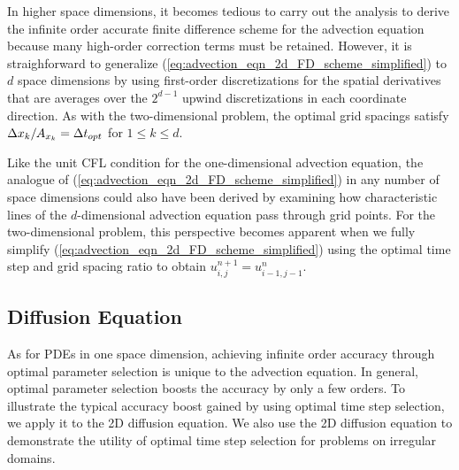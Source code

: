 \documentclass[oneeqnum,onefignum,onetabnum,onethmnum]{siamltex}
\begin{document}
In higher space dimensions, it becomes tedious to carry out the analysis 
to derive the infinite order accurate finite difference scheme for the 
advection equation because many high-order correction terms must be retained.  
However, it is straighforward to generalize 
(\ref{eq:advection_eqn_2d_FD_scheme_simplified}) to $d$ space dimensions by 
using first-order discretizations for the spatial derivatives that are 
averages over the $2^{d-1}$ upwind discretizations in each coordinate 
direction.   As with the two-dimensional problem, the optimal grid spacings 
satisfy $\Delta x_k/A_{x_k} = \Delta t_{opt}$ for $1 \le k \le d$.

Like the unit CFL condition for the one-dimensional advection equation, the 
analogue of (\ref{eq:advection_eqn_2d_FD_scheme_simplified}) in any number
of space dimensions could also have been derived by examining how 
characteristic lines of the $d$-dimensional advection equation pass 
through grid points.  For the two-dimensional problem, this perspective 
becomes apparent when we fully simplify 
(\ref{eq:advection_eqn_2d_FD_scheme_simplified}) using the 
optimal time step and grid spacing ratio to obtain
$u^{n+1}_{i,j} = u^{n}_{i-1,j-1}$.



\subsection{Diffusion Equation}
As for PDEs in one space dimension, achieving infinite order accuracy 
through optimal parameter selection is unique to the advection equation.
In general, optimal parameter selection boosts the accuracy by only a few 
orders.  To illustrate the typical accuracy boost gained by using optimal 
time step selection, we apply it to the 2D diffusion equation.  We also 
use the 2D diffusion equation to demonstrate the utility of optimal time 
step selection for problems on irregular domains. 
\end{document}
